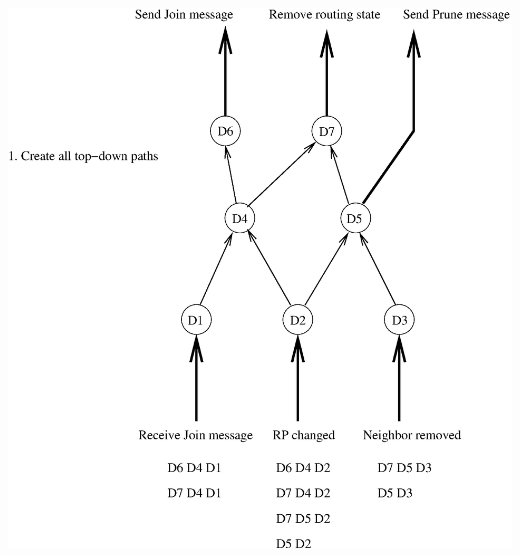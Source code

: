 \documentclass[landscape]{icsislides}
\begin{document}
\begin{slide}

\begin{center}
  \includegraphics[scale=0.55]{figs/pim_state_dependency2}
\end{center}

\end{slide}
\end{document}
